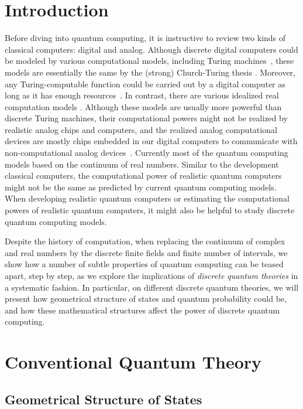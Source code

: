 \documentclass[twoside]{iuphd}
\begin{document}
\chapter{Introduction}

Before diving into quantum computing, it is instructive to review
two kinds of classical computers: digital and analog. Although discrete
digital computers could be modeled by various computational models,
including Turing machines~\cite{Turing_1937}, these models are essentially
the same by the (strong) Church-Turing thesis \cite{Church_1936,Turing_1937,Kleene_1943}.
Moreover, any Turing-computable function could be carried out by a
digital computer as long as it has enough resources~\cite{Piccinini2015}.
In contrast, there are various idealized real computation models \cite{Siegelmann1998,Ziegler2007,weihrauch2012computable,blum2012complexity}.
Although these models are usually more powerful than discrete Turing
machines, their computational powers might not be realized by realistic
analog chips and computers, and the realized analog computational
devices are mostly chips embedded in our digital computers to communicate
with non-computational analog devices~\cite{Camenzind2005}. Currently
most of the quantum computing models based on the continuum of real
numbers. Similar to the development classical computers, the computational
power of realistic quantum computers might not be the same as predicted
by current quantum computing models. When developing realistic quantum
computers or estimating the computational powers of realistic quantum
computers, it might also be helpful to study discrete quantum computing
models.

Despite the history of computation, when replacing the continuum of
complex and real numbers by the discrete finite fields and finite
number of intervals, we show how a number of subtle properties of
quantum computing can be teased apart, step by step, as we explore
the implications of \emph{discrete quantum theories} in a systematic
fashion. In particular, on different discrete quantum theories, we
will present how geometrical structure of states and quantum probability
could be, and how these mathematical structures affect the power of
discrete quantum computing. 

\chapter{Conventional Quantum Theory}

\section{Geometrical Structure of States}
\end{document}

